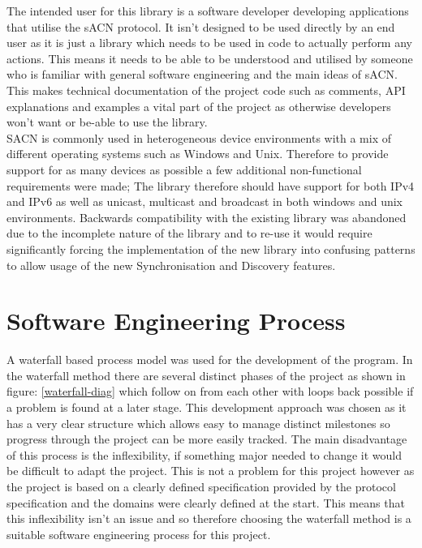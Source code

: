 \documentclass[11pt,a4paper]{article}
\begin{document}
The intended user for this library is a software developer developing applications that utilise the sACN protocol. It isn't designed to be used directly by an end user as it is just a library which needs to be used in code to actually perform any actions. This means it needs to be able to be understood and utilised by someone who is familiar with general software engineering and the main ideas of sACN. This makes technical documentation of the project code such as comments, API explanations and examples a vital part of the project as otherwise developers won't want or be-able to use the library.\\

SACN is commonly used in heterogeneous device environments with a mix of different operating systems such as Windows and Unix. Therefore to provide support for as many devices as possible a few additional non-functional requirements were made; The library therefore should have support for both IPv4 and IPv6 as well as unicast, multicast and broadcast in both windows and unix environments. Backwards compatibility with the existing library was abandoned due to the incomplete nature of the library and to re-use it would require significantly forcing the implementation of the new library into confusing patterns to allow usage of the new Synchronisation and Discovery features. \\	

\section{Software Engineering Process}
A waterfall based process model was used for the development of the program. In the waterfall method there are several distinct phases of the project as shown in figure: \ref{waterfall-diag} which follow on from each other with loops back possible if a problem is found at a later stage. This development approach was chosen as it has a very clear structure which allows easy to manage distinct milestones so progress through the project can be more easily tracked. The main disadvantage of this process is the inflexibility, if something major needed to change it would be difficult to adapt the project. This is not a problem for this project however as the project is based on a clearly defined specification provided by the protocol specification and the domains were clearly defined at the start. This means that this inflexibility isn't an issue and so therefore choosing the waterfall method is a suitable software engineering process for this project.
\end{document}
